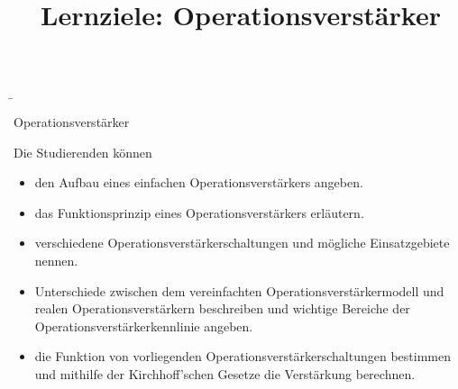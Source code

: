 \begin{frame}
    \b{
        \begin{Lernziele}{Operationsverstärker}
            \title{Lernziele: Operationsverstärker}
            Die Studierenden können
            \begin{itemize}
                \item den Aufbau eines einfachen Operationsverstärkers angeben.
                \item das Funktionsprinzip eines Operationsverstärkers erläutern.
                \item verschiedene Operationsverstärkerschaltungen und mögliche Einsatzgebiete nennen.
                \item Unterschiede zwischen dem vereinfachten Operationsverstärkermodell und realen Operationsverstärkern beschreiben und wichtige Bereiche der Operationsverstärkerkennlinie angeben.
                \item die Funktion von vorliegenden Operationsverstärkerschaltungen bestimmen und mithilfe der Kirchhoff'schen Gesetze die Verstärkung berechnen.
            \end{itemize}
        \end{Lernziele}
    }
\end{frame}

